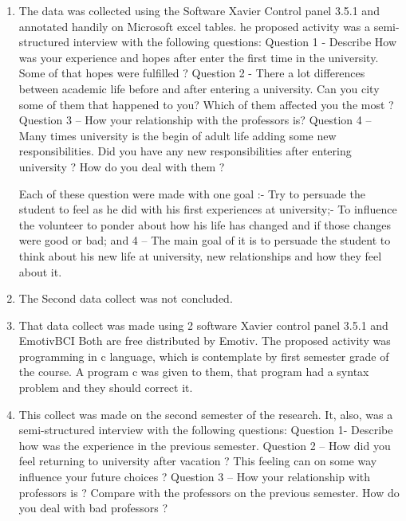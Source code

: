 \documentclass[12pt,openright,a4paper]{article}
\begin{document}
 \begin{enumerate}
 	\item The data was collected using the Software Xavier Control panel 3.5.1 and annotated handily on Microsoft excel tables.
 	 he proposed activity was a semi-structured interview with the following questions:\newline
 	 Question 1 - Describe How was your experience and hopes after enter the first time in the university. Some of that hopes were fulfilled ? \newline
 	 Question 2  - There a lot differences between academic life before and after entering a university. Can you city some of them that happened to you? Which of them affected you the most ?\newline
 	 Question 3 – How your relationship with the professors is?\newline
 	 Question 4 – Many times university is the begin of adult life adding some new responsibilities. Did you have any new responsibilities after entering university ? How do you deal with them ?\newline
 	 
 	 Each of these question were made with one goal :- Try to persuade the student to feel as he did with his first experiences at university;-  To influence the volunteer to ponder about how his life has changed and if those changes were good or bad; and 4 – The main goal of it is to persuade the student to think about his new life at university, new relationships and how they feel about it.\newline
  \item  The Second data collect was not concluded.
  \item That data collect was made using 2 software Xavier control panel 3.5.1 and EmotivBCI Both are free distributed by Emotiv. The proposed activity was programming in c language, which is contemplate by first semester grade of the course. A program c was given to them, that program had a syntax problem and they should correct it. 
  
  \item This collect was made on the second semester of the research. It, also, was a semi-structured interview with the following questions:\newline
  Question 1- Describe how was the experience in the previous semester.\newline
  Question 2 – How did you feel returning to university after vacation ? This feeling can on some way influence your future choices ?\newline
  Question 3 – How your relationship with professors is ? Compare with the professors on the previous semester. How do you deal with bad professors ?\newline
  

\end{enumerate}
\end{document}
